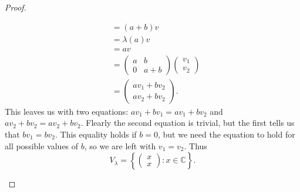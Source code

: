 \documentclass[12pt]{article}
\theoremstyle{definition}
\begin{document}
\begin{proof}
\begin{enumerate}[label=(\alph*)]
\begin{align*}
			                                                             & = (a + b)v                                                                           \\
			                                                             & = \lambda(a)v                                                                        \\
			                                                             & = av                                                                                 \\
			                                                             & = \begin{pmatrix}a & b \\ 0 & a + b\end{pmatrix}\begin{pmatrix}v_1\\v_2\end{pmatrix} \\
			                                                             & = \begin{pmatrix}av_1 + bv_2 \\ av_2 + bv_2\end{pmatrix}.
		      \end{align*}
		      This leaves us with two equations: $av_1 + bv_1 = av_1 + bv_2$ and $av_2 + bv_2 = av_2 + bv_2$.
		      Flearly the second equation is trivial, but the first tells us that $bv_1 = bv_2$.
		      This equality holds if $b = 0$, but we need the equation to hold for all possible values of $b$, so we are left with $v_1 = v_2$.
		      Thus \begin{equation*}
			      V_\lambda = \left\lbrace \begin{pmatrix}x\\x\end{pmatrix} : x \in \mathbb{C} \right\rbrace.
		      \end{equation*}
	\end{enumerate}
\end{proof}
\end{document}
